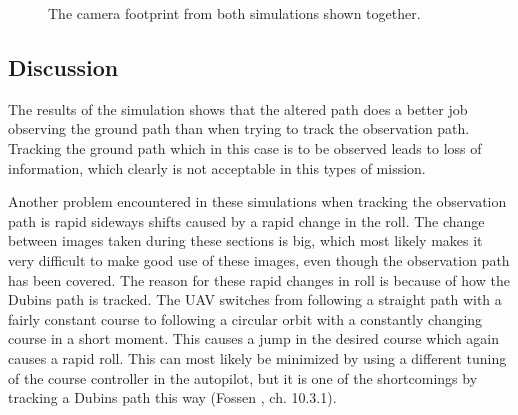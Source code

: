 
\begin{figure}[]
    \centering
    \caption{The camera footprint from both simulations shown together.}
	\label{fig:both_camera_turns}
\end{figure}


\subsection{Discussion}

The results of the simulation shows that the altered path does a better job observing the ground path than when trying to track the observation path. Tracking the ground path which in this case is to be observed leads to loss of information, which clearly is not acceptable in this types of mission.

Another problem encountered in these simulations when tracking the observation path is rapid sideways shifts caused by a rapid change in the roll. The change between images taken during these sections is big, which most likely makes it very difficult to make good use of these images, even though the observation path has been covered. The reason for these rapid changes in roll is because of how the Dubins path is tracked. The UAV switches from following a straight path with a fairly constant course to following a circular orbit with a constantly changing course in a short moment. This causes a jump in the desired course which again causes a rapid roll. This can most likely be minimized by using a different tuning of the course controller in the autopilot, but it is one of the shortcomings by tracking a Dubins path this way (Fossen \cite{fartoyFOSSEN}, ch. 10.3.1). 

